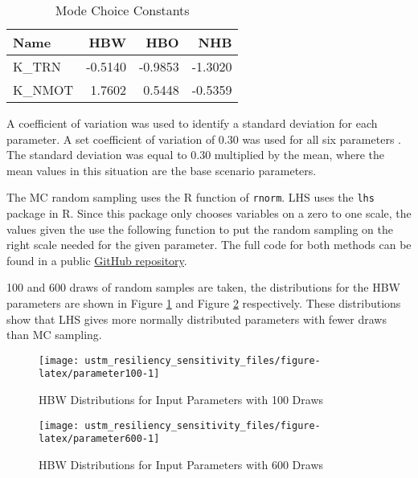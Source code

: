\documentclass[3p, authoryear, review]{elsarticle} %
\begin{document}
\begin{table}

\caption{\label{tab:MCconst}Mode Choice Constants}
\centering
\begin{tabular}[t]{l|r|r|r}
\hline
Name & HBW & HBO & NHB\\
\hline
K\_TRN & -0.5140 & -0.9853 & -1.3020\\
\hline
K\_NMOT & 1.7602 & 0.5448 & -0.5359\\
\hline
\end{tabular}
\end{table}

A coefficient of variation was used to identify a standard deviation for each parameter. A set coefficient of variation of 0.30 was used for all six parameters \citep{zhao2002propagation}. The standard deviation was equal to 0.30 multiplied by the mean, where the mean values in this situation are the base scenario parameters.

The MC random sampling uses the R function of \texttt{rnorm}. LHS uses the \texttt{lhs} package in R. Since this package only chooses variables on a zero to one scale, the values given the use the following function to put the random sampling on the right scale needed for the given parameter. The full code for both methods can be found in a public
\href{https://github.com/natmaegray/ustm_resiliency_sensitivity}{GitHub repository}.

100 and 600 draws of random samples are taken, the distributions for the HBW parameters are shown in Figure \ref{fig:parameter100} and Figure \ref{fig:parameter600} respectively. These distributions show that LHS gives more normally distributed parameters with fewer draws than MC sampling.

\begin{figure}

{\centering \texttt{[image: ustm\_resiliency\_sensitivity\_files/figure-latex/parameter100-1]} 

}

\caption{HBW Distributions for Input Parameters with 100 Draws}\label{fig:parameter100}
\end{figure}

\begin{figure}

{\centering \texttt{[image: ustm\_resiliency\_sensitivity\_files/figure-latex/parameter600-1]} 

}

\caption{HBW Distributions for Input Parameters with 600 Draws}\label{fig:parameter600}
\end{figure}
\end{document}
